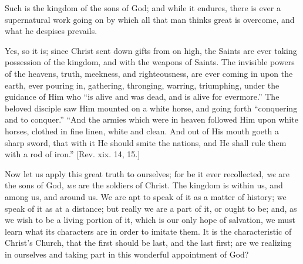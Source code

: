 Such is the kingdom of the sons of God; and while it endures, there
is ever a supernatural work going on by which all that man thinks
great is overcome, and what he despises prevails.

Yes, so it is; since Christ sent down gifts from on high, the
Saints are ever taking possession of the kingdom, and with the weapons
of Saints. The invisible powers of the heavens, truth, meekness, and
righteousness, are ever coming in upon the earth, ever pouring in,
gathering, thronging, warring, triumphing, under the guidance of Him
who ``is alive and was dead, and is alive for evermore.'' The
beloved disciple saw Him mounted on a white horse, and going forth
``conquering and to conquer.'' ``And the armies which were
in heaven followed Him upon white horses, clothed in fine linen, white
and clean. And out of His mouth goeth a sharp sword, that with it He
should smite the nations, and He shall rule them with a rod of
iron.'' [Rev. xix. 14, 15.]

Now let us apply this great truth to ourselves; for be it ever
recollected, \emph{we} are the sons of God, \emph{we} are the soldiers
of Christ. The kingdom is within us, and among us, and around us. We
are apt to speak of it as a matter of history; we speak of it as at a
distance; but really we are a part of it, or ought to be; and, as we
wish to be a living portion of it, which is our only hope of
salvation, we must learn what its characters are in order to imitate
them. It is the characteristic of Christ's Church, that the first
should be last, and the last first; are we realizing in ourselves and
taking part in this wonderful appointment of God?

